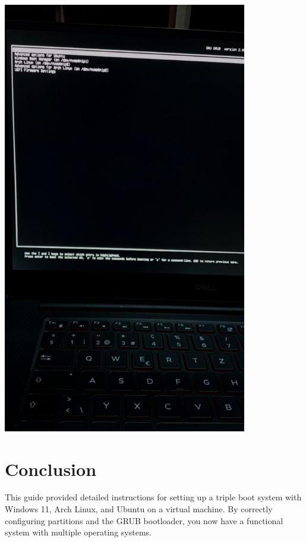 \documentclass[a4paper]{article}
\begin{document}
\begin{center}
    \includegraphics[width=0.8\textwidth]{ff.jpeg} %
\end{center}

\section{Conclusion}
This guide provided detailed instructions for setting up a triple boot system with Windows 11, Arch Linux, and Ubuntu on a virtual machine. By correctly configuring partitions and the GRUB bootloader, you now have a functional system with multiple operating systems.
\end{document}
